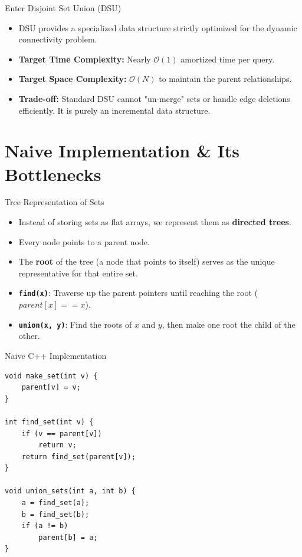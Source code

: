 \documentclass{beamer}
\begin{document}
\begin{frame}[fragile]{Enter Disjoint Set Union (DSU)}
    \begin{itemize}
        \item DSU provides a specialized data structure strictly optimized for the dynamic connectivity problem.
        \item \textbf{Target Time Complexity:} Nearly $\mathcal{O}(1)$ amortized time per query.
        \item \textbf{Target Space Complexity:} $\mathcal{O}(N)$ to maintain the parent relationships.
        \item \textbf{Trade-off:} Standard DSU cannot "un-merge" sets or handle edge deletions efficiently. It is purely an incremental data structure.
    \end{itemize}
\end{frame}

\section{Naive Implementation \& Its Bottlenecks}

\begin{frame}{Tree Representation of Sets}
    \begin{itemize}
        \item Instead of storing sets as flat arrays, we represent them as \textbf{directed trees}.
        \item Every node points to a parent node.
        \item The \textbf{root} of the tree (a node that points to itself) serves as the unique representative for that entire set.
        \item \textbf{\texttt{find(x)}}: Traverse up the parent pointers until reaching the root ($parent[x] == x$).
        \item \textbf{\texttt{union(x, y)}}: Find the roots of $x$ and $y$, then make one root the child of the other.
    \end{itemize}
\end{frame}

\begin{frame}[fragile]{Naive C++ Implementation}
\footnotesize
\begin{verbatim}
void make_set(int v) {
    parent[v] = v;
}

int find_set(int v) {
    if (v == parent[v])
        return v;
    return find_set(parent[v]);
}

void union_sets(int a, int b) {
    a = find_set(a);
    b = find_set(b);
    if (a != b)
        parent[b] = a;
}
\end{verbatim}
\end{frame}
\end{document}
